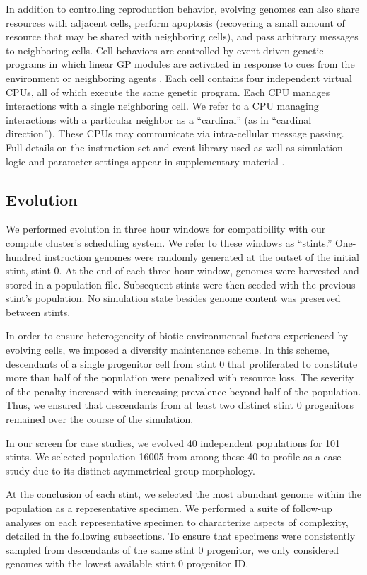 In addition to controlling reproduction behavior, evolving genomes can also share resources with adjacent cells, perform apoptosis (recovering a small amount of resource that may be shared with neighboring cells), and pass arbitrary messages to neighboring cells.
Cell behaviors are controlled by event-driven genetic programs in which linear GP modules are activated in response to cues from the environment or neighboring agents \citep{lalejini2018evolving}.
Each cell contains four independent virtual CPUs, all of which execute the same genetic program.
Each CPU manages interactions with a single neighboring cell.
We refer to a CPU managing interactions with a particular neighbor as a ``cardinal'' (as in ``cardinal direction'').
These CPUs may communicate via intra-cellular message passing.
Full details on the instruction set and event library used as well as simulation logic and parameter settings appear in supplementary material \citep{Moreno_2021}.

\subsection{Evolution}

We performed evolution in three hour windows for compatibility with our compute cluster's scheduling system.
We refer to these windows as ``stints.''
One-hundred instruction genomes were randomly generated at the outset of the initial stint, stint 0.
At the end of each three hour window, genomes were harvested and stored in a population file.
Subsequent stints were then seeded with the previous stint's population.
No simulation state besides genome content was preserved between stints.

In order to ensure heterogeneity of biotic environmental factors experienced by evolving cells, we imposed a diversity maintenance scheme.
In this scheme, descendants of a single progenitor cell from stint 0 that proliferated to constitute more than half of the population were penalized with resource loss.
The severity of the penalty increased with increasing prevalence beyond half of the population.
Thus, we ensured that descendants from at least two distinct stint 0 progenitors remained over the course of the simulation. 

In our screen for case studies, we evolved 40 independent populations for 101 stints.
We selected population 16005 from among these 40 to profile as a case study due to its distinct asymmetrical group morphology.

At the conclusion of each stint, we selected the most abundant genome within the population as a representative specimen.
We performed a suite of follow-up analyses on each representative specimen to characterize aspects of complexity, detailed in the following subsections.
To ensure that specimens were consistently sampled from descendants of the same stint 0 progenitor, we only considered genomes with the lowest available stint 0 progenitor ID.

